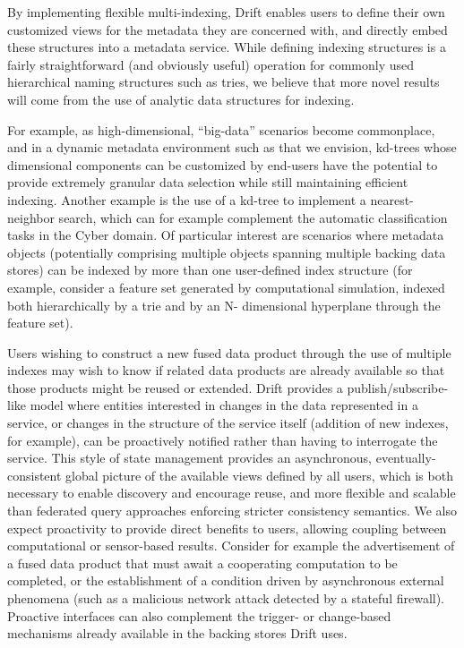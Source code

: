 By implementing flexible multi-indexing, Drift enables users to define their own customized views for the
metadata they are concerned with, and directly embed these structures into a metadata service. While
defining indexing structures is a fairly straightforward (and obviously useful) operation for commonly
used hierarchical naming structures such as tries, we believe that more novel results will come from the
use of analytic data structures for indexing. 

For example, as high-dimensional, “big-data” scenarios become commonplace, and in a dynamic metadata
environment such as that we envision, kd-trees\cite{bentley80:_multid} whose dimensional components can
be customized by end-users have the potential to provide extremely granular data selection while still
maintaining efficient indexing. Another example is the use of a kd-tree to implement a nearest-neighbor
search, which can for example complement the automatic classification tasks in the Cyber domain. Of
particular interest are scenarios where metadata objects (potentially comprising multiple objects
spanning multiple backing data stores) can be indexed by more than one user-defined index structure (for
example, consider a feature set generated by computational simulation, indexed both hierarchically by a
trie and by an N- dimensional hyperplane through the feature set).

Users wishing to construct a new fused data product through the use of multiple indexes may wish to know
if related data products are already available so that those products might be reused or extended. Drift
provides a publish/subscribe-like model where entities interested in changes in the data represented in a
service, or changes in the structure of the service itself (addition of new indexes, for example), can be
proactively notified rather than having to interrogate the service.  This style of state management
provides an asynchronous, eventually-consistent global picture of the available views defined by all
users, which is both necessary to enable discovery and encourage reuse, and more flexible and scalable
than federated query approaches enforcing stricter consistency semantics. We also expect proactivity to
provide direct benefits to users, allowing coupling between computational or sensor-based
results. Consider for example the advertisement of a fused data product that must await a cooperating
computation to be completed, or the establishment of a condition driven by asynchronous external
phenomena (such as a malicious network attack detected by a stateful firewall). Proactive interfaces can
also complement the trigger- or change-based mechanisms already available in the backing stores Drift
uses.

